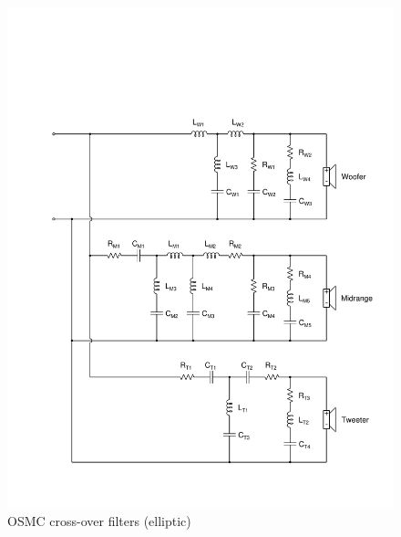 \documentclass[12pt,a4paper]{article}
\providecommand{\figlabel}[1]{\label{fig:#1}}
\begin{document}
\begin{figure}[p]
	\centering
	\includegraphics[width=\textwidth]{EL34_20190303.pdf}
	\caption{OSMC cross-over filters (elliptic)}
	\figlabel{OSMC_EL_xover_schem}
\end{figure}
\end{document}
